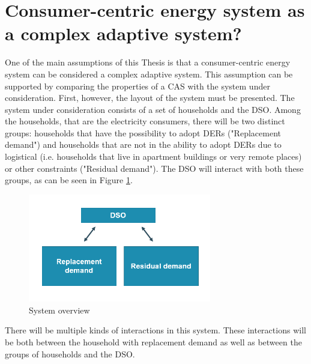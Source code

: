 \section{Consumer-centric energy system as a complex adaptive system?} \label{CASEnergy}
One of the main assumptions of this Thesis is that a consumer-centric energy system can be considered a complex adaptive system. This assumption can be supported by comparing the properties of a CAS with the system under consideration. First, however, the layout of the system must be presented.
\newline \newline \noindent
The system under consideration consists of a set of households and the DSO. Among the households, that are the electricity consumers, there will be two distinct groups: households that have the possibility to adopt DERs ("Replacement demand") and households that are not in the ability to adopt DERs due to logistical (i.e. households that live in apartment buildings or very remote places) or other constraints ("Residual demand"). The DSO will interact with both these groups, as can be seen in Figure \ref{Figure:split}.  
\begin{figure}[h!]
\centering
\includegraphics[width=8cm]{modelarge.PNG}
\caption{System overview}
\label{Figure:split}
\end{figure}
\noindent 
There will be multiple kinds of interactions in this system. These interactions will be both between the household with replacement demand as well as between the groups of households and the DSO. 
\newline \newline \noindent
